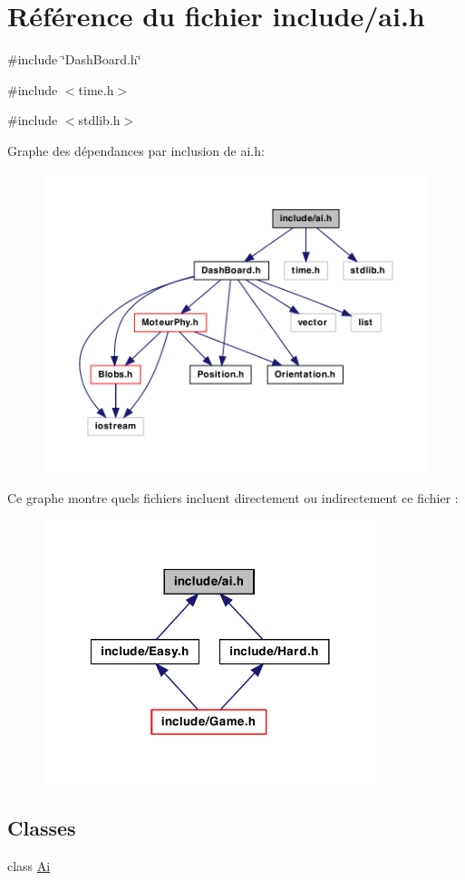\hypertarget{a00016}{
\section{Référence du fichier include/ai.h}
\label{a00016}
}
{\ttfamily \#include \char`\"{}DashBoard.h\char`\"{}}\par
{\ttfamily \#include $<$time.h$>$}\par
{\ttfamily \#include $<$stdlib.h$>$}\par
Graphe des dépendances par inclusion de ai.h:
\nopagebreak
\begin{figure}[H]
\begin{center}
\leavevmode
\includegraphics[width=400pt]{a00038}
\end{center}
\end{figure}
Ce graphe montre quels fichiers incluent directement ou indirectement ce fichier :
\nopagebreak
\begin{figure}[H]
\begin{center}
\leavevmode
\includegraphics[width=276pt]{a00039}
\end{center}
\end{figure}
\subsection*{Classes}
\begin{DoxyCompactItemize}
\item 
class \hyperlink{a00001}{Ai}
\end{DoxyCompactItemize}
